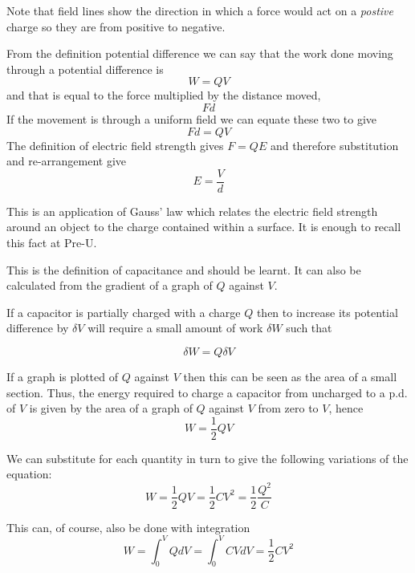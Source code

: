 \documentclass[revision-guide.tex]{subfiles}
\begin{document}
Note that field lines show the direction in which a force would act on a \emph{postive} charge so they are from positive to negative.


From the definition potential difference we can say that the work done moving through a potential difference is \[ W = QV \] and that is equal to the force multiplied by the distance moved, \[ Fd \] If the movement is through a uniform field we can equate these two to give
\[ Fd = QV \]
The definition of electric field strength gives $F=QE$ and therefore substitution and re-arrangement give \[ E = \frac{V}{d} \]


This is an application of Gauss' law which relates the electric field strength around an object to the charge contained within a surface. It is enough to recall this fact at Pre-U.


This is the definition of capacitance and should be learnt. It can also be calculated from the gradient of a graph of $Q$ against $V$.


If a capacitor is partially charged with a charge $Q$ then to increase its potential difference by $\delta V$ will require a small amount of work $\delta W$ such that

\[ \delta W = Q \delta V  \]

If a graph is plotted of $Q$ against $V$ then this can be seen as the area of a small section. Thus, the energy required to charge a capacitor from uncharged to a p.d. of $V$ is given by the area of a graph of $Q$ against $V$ from zero to $V$, hence
\[ W = \frac{1}{2}QV \]

We can substitute for each quantity in turn to give the following variations of the equation:
\[ W = \frac{1}{2}QV = \frac{1}{2}CV^2 = \frac{1}{2}\frac{Q^2}{C} \]

This can, of course, also be done with integration
\[ W = \int_0^V Q dV = \int_0^V CV dV  = \frac{1}{2}CV^2 \]
\end{document}
